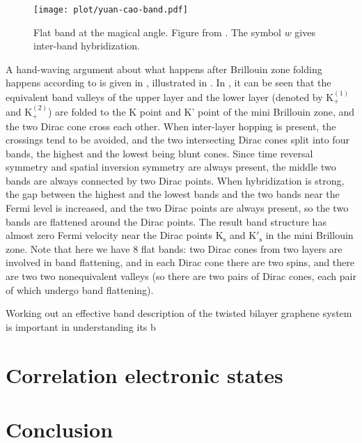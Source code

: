 \documentclass[hyperref, a4paper]{article}
\begin{document}
\begin{figure}
    \centering
    \texttt{[image: plot/yuan-cao-band.pdf]}
    \caption{Flat band at the magical angle. Figure from \cite{cao_correlated_2018}.
    The symbol $w$ gives inter-band hybridization.}
    \label{fig:flat-band-generation}
\end{figure}

A hand-waving argument about what happens after Brillouin zone folding happens according to 
is given in \cite{cao_correlated_2018},
illustrated in .
In , it can be seen that 
the equivalent band valleys of the upper layer and the lower layer 
(denoted by $\mathrm{K}^{(1)}_+$ and $\mathrm{K}^{(2)}_+$)
are folded to the K point and K' point of the mini Brillouin zone,
and the two Dirac cone cross each other.
When inter-layer hopping is present,
the crossings tend to be avoided,
and the two intersecting Dirac cones split into four bands,
the highest and the lowest being blunt cones.
Since time reversal symmetry and spatial inversion symmetry are always present,
the middle two bands are always connected by two Dirac points.
When hybridization is strong, the gap between the highest and the lowest bands 
and the two bands near the Fermi level is increased,
and the two Dirac points are always present,
so the two bands are flattened around the Dirac points.
The result band structure has almost zero Fermi velocity near the Dirac points 
$\mathrm{K}_{\text{s}}$  and $\mathrm{K}'_{\text{s}}$ in the mini Brillouin zone.
Note that here we have 8 flat bands:
two Dirac cones from two layers are involved in band flattening,
and in each Dirac cone there are two spins,
and there are two two nonequivalent valleys 
(so there are two pairs of Dirac cones, 
each pair of which undergo band flattening).

Working out an effective band description of the twisted bilayer graphene system 
is important in understanding its b

\section{Correlation electronic states}



\section{Conclusion}

\printbibliography
\end{document}
